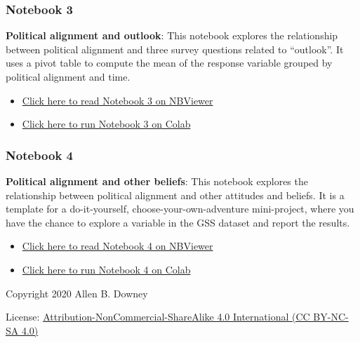 \hypertarget{notebook-3}{%
\subsubsection{Notebook 3}\label{notebook-3}}

\textbf{Political alignment and outlook}: This notebook explores the
relationship between political alignment and three survey questions
related to ``outlook''. It uses a pivot table to compute the mean of the
response variable grouped by political alignment and time.

\begin{itemize}
\item
  \href{https://nbviewer.jupyter.org/github/AllenDowney/PoliticalAlignmentCaseStudy/blob/master/03_outlook.ipynb}{Click
  here to read Notebook 3 on NBViewer}
\item
  \href{https://colab.research.google.com/github/AllenDowney/PoliticalAlignmentCaseStudy/blob/master/03_outlook.ipynb}{Click
  here to run Notebook 3 on Colab}
\end{itemize}

\hypertarget{notebook-4}{%
\subsubsection{Notebook 4}\label{notebook-4}}

\textbf{Political alignment and other beliefs}: This notebook explores
the relationship between political alignment and other attitudes and
beliefs. It is a template for a do-it-yourself,
choose-your-own-adventure mini-project, where you have the chance to
explore a variable in the GSS dataset and report the results.

\begin{itemize}
\item
  \href{https://nbviewer.jupyter.org/github/AllenDowney/PoliticalAlignmentCaseStudy/blob/master/04_worldview.ipynb}{Click
  here to read Notebook 4 on NBViewer}
\item
  \href{https://colab.research.google.com/github/AllenDowney/PoliticalAlignmentCaseStudy/blob/master/04_worldview.ipynb}{Click
  here to run Notebook 4 on Colab}
\end{itemize}

Copyright 2020 Allen B. Downey

License:
\href{https://creativecommons.org/licenses/by-nc-sa/4.0/}{Attribution-NonCommercial-ShareAlike
4.0 International (CC BY-NC-SA 4.0)}
